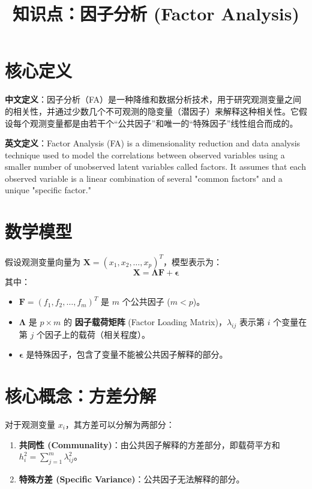 \documentclass[12pt, a4paper]{article}
\title{知识点：因子分析 (Factor Analysis)}
\author{}
\date{}
\begin{document}
\maketitle

\section{核心定义}
\textbf{中文定义}：因子分析（FA）是一种降维和数据分析技术，用于研究观测变量之间的相关性，并通过少数几个不可观测的隐变量（潜因子）来解释这种相关性。它假设每个观测变量都是由若干个“公共因子”和唯一的“特殊因子”线性组合而成的。

\textbf{英文定义}：Factor Analysis (FA) is a dimensionality reduction and data analysis technique used to model the correlations between observed variables using a smaller number of unobserved latent variables called factors. It assumes that each observed variable is a linear combination of several "common factors" and a unique "specific factor."

\section{数学模型}
假设观测变量向量为 $\mathbf{X} = (x_1, x_2, \dots, x_p)^T$，模型表示为：
$$ \mathbf{X} = \mathbf{\Lambda} \mathbf{F} + \mathbf{\epsilon} $$
其中：
\begin{itemize}
    \item $\mathbf{F} = (f_1, f_2, \dots, f_m)^T$ 是 $m$ 个公共因子 ($m < p$)。
    \item $\mathbf{\Lambda}$ 是 $p \times m$ 的 \textbf{因子载荷矩阵} (Factor Loading Matrix)，$\lambda_{ij}$ 表示第 $i$ 个变量在第 $j$ 个因子上的载荷（相关程度）。
    \item $\mathbf{\epsilon}$ 是特殊因子，包含了变量不能被公共因子解释的部分。
\end{itemize}

\section{核心概念：方差分解}
对于观测变量 $x_i$，其方差可以分解为两部分：
\begin{enumerate}
    \item \textbf{共同性 (Communality)}：由公共因子解释的方差部分，即载荷平方和 $h_i^2 = \sum_{j=1}^m \lambda_{ij}^2$。
    \item \textbf{特殊方差 (Specific Variance)}：公共因子无法解释的部分。
\end{enumerate}
\end{document}
